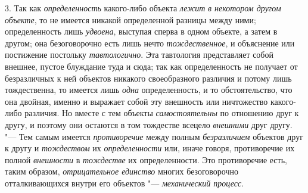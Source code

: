 {{3. Так как {\em определенность} какого-либо объекта {\em лежит}
{\em в некотором другом объекте},
то не имеется никакой определенной разницы между ними;
определенность лишь {\em удвоена},
выступая сперва в одном объекте, а затем в другом; она
безоговорочно есть лишь нечто {\em тождественное}, и
объяснение или постижение постольку {\em тавтологично}. Эта
тавтология представляет собой внешнее, пустое блуждание туда и сюда; так
как определенность не получает от безразличных к ней объектов никакого
своеобразного различия и потому лишь тождественна, то имеется лишь {\em одна}
определенность, и то обстоятельство, что она двойная, именно
и выражает собой эту внешность или ничтожество какого-либо различия. Но
вместе с тем объекты {\em самостоятельны} по
отношению друг к другу, и поэтому они остаются в том тождестве всецело
{\em внешними} друг другу. "--- Тем самым имеется {\em противоречие} между
полным {\em безразличием} объектов друг к другу и {\em тождеством} их
{\em определенности} или, иначе говоря, противоречие их полной
{\em внешности} в {\em тождестве} их определенности. Это противоречие есть,
таким образом, {\em отрицательное единство} многих безоговорочно
отталкивающихся внутри его объектов "--- {\em механический процесс}.

}}
